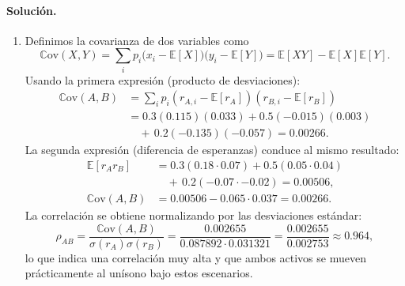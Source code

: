 \documentclass[12pt,a4paper]{article}
\newcommand{\E}{\mathbb{E}}
\newcommand{\Cov}{\mathbb{C}\text{ov}}
\newenvironment{solucion}{\paragraph{Solución.}}{}
\begin{document}
\begin{solucion}
\begin{enumerate}[label=\alph*)]
  \item Definimos la covarianza de dos variables como
  \[
  \Cov(X,Y) = \sum_i p_i\big(x_i-\E[X]\big)\big(y_i-\E[Y]\big) = \E[XY] - \E[X]\E[Y].
  \]
  Usando la primera expresión (producto de desviaciones):
  \begin{align*}
  \Cov(A,B) &= \sum_i p_i(r_{A,i}-\E[r_A])(r_{B,i}-\E[r_B]) \\
                  &= 0.3(0.115)(0.033) + 0.5(-0.015)(0.003) \\
                  &\quad +\, 0.2(-0.135)(-0.057) = 0.00266.
  \end{align*}
  La segunda expresión (diferencia de esperanzas) conduce al mismo resultado:
  \begin{align*}
  \E[r_A r_B] &= 0.3(0.18\cdot0.07) + 0.5(0.05\cdot0.04) \\
              &\quad +\, 0.2(-0.07\cdot -0.02) = 0.00506,\\
  \Cov(A,B) &= 0.00506 - 0.065\cdot0.037 = 0.00266.
  \end{align*}
  La correlación se obtiene normalizando por las desviaciones estándar:
  \[
  \rho_{AB} = \frac{\Cov(A,B)}{\sigma(r_A)\sigma(r_B)} = \frac{0.002655}{0.087892 \cdot 0.031321} = \frac{0.002655}{0.002753} \approx 0.964,
  \]
  lo que indica una correlación muy alta y que ambos activos se mueven prácticamente al unísono bajo estos escenarios.


\end{enumerate}
\end{solucion}
\end{document}
